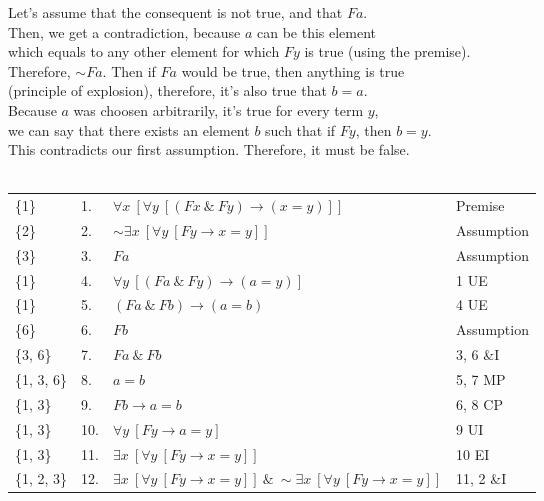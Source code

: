 \documentclass[a4paper,12pt]{article}
\newcommand{\ra}{\rightarrow}
\newcommand{\s}{\sim}
\newcommand{\ta}{ \ \& \ }
\newcommand{\all}{\forall}
\newcommand{\ex}{\exists}
\begin{document}
\begin{enumerate}[label=\arabic*,leftmargin=*]
\begin{enumerate}[label=\arabic*.]
\begin{minipage}{\textwidth}
                    Let's assume that the consequent is not true, and that $Fa$.\\
                    Then, we get a contradiction, because $a$ can be this element\\
                    which equals to any other element for which $Fy$ is true (using the premise).\\
                    Therefore, $\s Fa$. Then if $Fa$ would be true, then anything is true\\
                    (principle of explosion), therefore, it's also true that $b=a$.\\
                    Because $a$ was choosen arbitrarily, it's true for every term $y$,\\
                    we can say that there exists an element $b$ such that if $Fy$, then $b=y$.\\
                    This contradicts our first assumption. Therefore, it must be false.\\
                    \vspace{1em}\\
                    \begin{tabular}{l l l l}
                        \{1\}           &  1. & $\all x \ [\all y \ [(Fx \ta Fy) \ra (x=y)]]$ & Premise\\
                        \{2\}           &  2. & $\s \ex x \ [\all y \ [Fy \ra x=y]]$ & Assumption\\
                        \{3\}           &  3. & $Fa$ & Assumption\\
                        \{1\}           &  4. & $\all y \ [(Fa \ta Fy) \ra (a=y)]$ & 1 UE\\
                        \{1\}           &  5. & $(Fa \ta Fb) \ra (a=b)$ & 4 UE\\
                        \{6\}           &  6. & $Fb$ & Assumption\\
                        \{3, 6\}        &  7. & $Fa \ta Fb$ & 3, 6 \&I\\
                        \{1, 3, 6\}     &  8. & $a=b$ & 5, 7 MP\\
                        \{1, 3\}        &  9. & $Fb \ra a=b$ & 6, 8 CP\\
                        \{1, 3\}        & 10. & $\all y \ [Fy \ra a=y]$ & 9 UI\\
                        \{1, 3\}        & 11. & $\ex x \ [\all y \ [Fy \ra x=y]]$ & 10 EI\\
                        \{1, 2, 3\}     & 12. & $\ex x \ [\all y \ [Fy \ra x=y]] \ta \s \ex x \ [\all y \ [Fy \ra x=y]]$ & 11, 2 \&I\\

\end{tabular}
\end{minipage}
\end{enumerate}
\end{enumerate}
\end{document}
